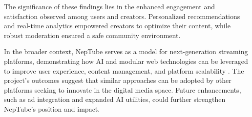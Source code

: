 The significance of these findings lies in the enhanced engagement and satisfaction observed among users and creators. Personalized recommendations \cite{he2017neural, gomezuribe2016netflix} and real-time analytics empowered creators to optimize their content, while robust moderation ensured a safe community environment.

In the broader context, NepTube serves as a model for next-generation streaming platforms, demonstrating how AI and modular web technologies \cite{vercel2024nextjs, trpc2024docs} can be leveraged to improve user experience, content management, and platform scalability \cite{wang2019webscale}. The project's outcomes suggest that similar approaches can be adopted by other platforms seeking to innovate in the digital media space. Future enhancements, such as ad integration and expanded AI utilities, could further strengthen NepTube's position and impact.
